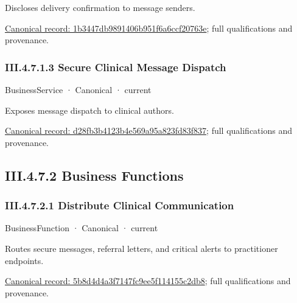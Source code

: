 Discloses delivery confirmation to message senders.


{\footnotesize \href{../../../../continuum/business/business-service/1b3447db9891406b951f6a6ccf20763e.md}{Canonical record: 1b3447db9891406b951f6a6ccf20763e}; full qualifications and provenance.}\par
\subsubsection*{III.4.7.1.3 Secure Clinical Message Dispatch}
\label{navigation:III.4.7.1.3}

\label{element:d28fb3b4123b4e569a95a823fd83f837}
{\small BusinessService · Canonical · current}\par

Exposes message dispatch to clinical authors.


{\footnotesize \href{../../../../continuum/business/business-service/d28fb3b4123b4e569a95a823fd83f837.md}{Canonical record: d28fb3b4123b4e569a95a823fd83f837}; full qualifications and provenance.}\par
\subsection*{III.4.7.2 Business Functions}
\label{navigation:III.4.7.2}

\subsubsection*{III.4.7.2.1 Distribute Clinical Communication}
\label{navigation:III.4.7.2.1}

\label{element:5b8d4d4a3f7147fc9ee5f114155c2db8}
{\small BusinessFunction · Canonical · current}\par

Routes secure messages, referral letters, and critical alerts to practitioner endpoints.


{\footnotesize \href{../../../../continuum/business/business-function/5b8d4d4a3f7147fc9ee5f114155c2db8.md}{Canonical record: 5b8d4d4a3f7147fc9ee5f114155c2db8}; full qualifications and provenance.}\par
